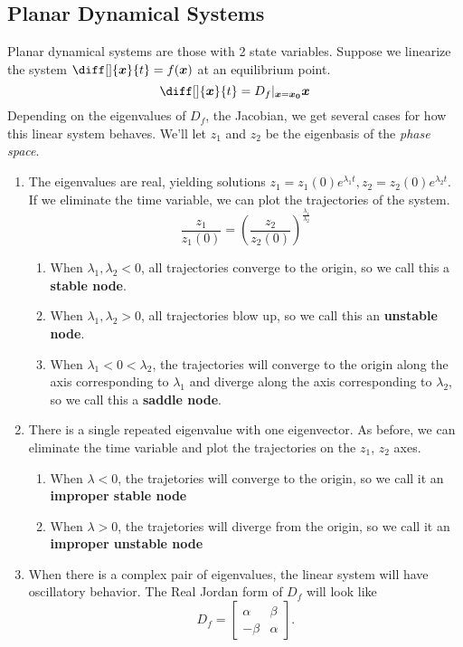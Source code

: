 \subsection{Planar Dynamical Systems}
Planar dynamical systems are those with 2 state variables.
Suppose we linearize the system $\diff[]{\bs{x}}{t} = f(\bs{x})$ at an equilibrium point.
\[
	\diff[]{\bs{x}}{t} = D_f|_{\bs{x} = \bs{x_0}}\bs{x} 
\]
Depending on the eigenvalues of $D_f$, the Jacobian, we get several cases for
how this linear system behaves. We'll let $z_1$ and $z_2$ be the eigenbasis of
the \textit{phase space}.
\begin{enumerate}
	\item The eigenvalues are real, yielding solutions $z_1 = z_1(0)e^{\lambda_1
		t}, z_2 = z_2(0)e^{\lambda_2 t}$. If we eliminate the time variable, we can
		plot the trajectories of the system.
		\[
			\frac{z_1}{z_1(0)} = \left(\frac{z_2}{z_2(0)}\right)^{\frac{\lambda_1}{\lambda_2}}
		\]
		\begin{enumerate}
			\item When $\lambda_1, \lambda_2 < 0$, all trajectories converge to the origin, so we call this a \textbf{stable node}.
			\item When $\lambda_1, \lambda_2 > 0$, all trajectories blow up, so we call this an \textbf{unstable node}.
			\item When $\lambda_1 < 0 < \lambda_2$, the trajectories will converge to
				the origin along the axis corresponding to $\lambda_1$ and diverge along
				the axis corresponding to $\lambda_2$, so we call this a \textbf{saddle node}.
		\end{enumerate}
	\item There is a single repeated eigenvalue with one eigenvector. As before,
		we can eliminate the time variable and plot the trajectories on the $z_1$,
		$z_2$ axes.
		\begin{enumerate}
			\item When $\lambda < 0$, the trajetories will converge to the origin, so
				we call it an \textbf{improper stable node}
			\item When $\lambda > 0$, the trajetories will diverge from the origin, so
				we call it an \textbf{improper unstable node}
		\end{enumerate}
	\item When there is a complex pair of eigenvalues, the linear system will have
		oscillatory behavior. The Real Jordan form of $D_f$ will look like \[
			D_f = \begin{bmatrix} \alpha & \beta \\ -\beta & \alpha \end{bmatrix}.
\]
\end{enumerate}
